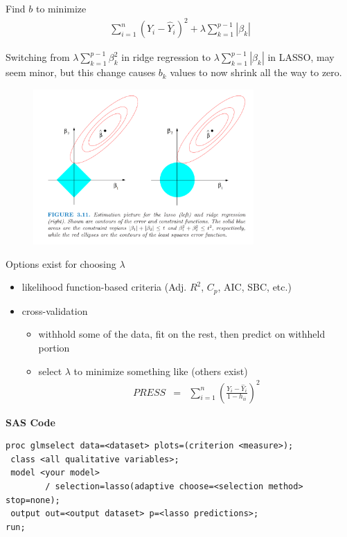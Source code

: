 \documentclass[12pt]{../notes}
\begin{document}
Find $b$ to minimize
  \begin{eqnarray}
    \sum_{i=1}^{n} \left( Y_i - \hat{Y}_i \right)^2 + \lambda \sum_{k=1}^{p-1} |\beta_k| \nonumber
  \end{eqnarray}
  
 Switching from $\lambda \sum_{k=1}^{p-1} \beta_k^2$ in ridge regression to $\lambda \sum_{k=1}^{p-1} |\beta_k|$ in LASSO, may seem minor, but this change causes $b_k$ values to now shrink all the way to zero. 


\begin{figure}[H]
\centering
\includegraphics[width = 0.75\textwidth]{../figures/module4/lasso.png}
\end{figure}

Options exist for choosing $\lambda$ 
\begin{itemize}
  \item likelihood function-based criteria (Adj. $R^2$, $C_p$, AIC, SBC, etc.)
  \item cross-validation
    \begin{itemize}
      \item withhold some of the data, fit on the rest, then predict on withheld portion
      \item select $\lambda$ to minimize something like (others exist)
        \begin{eqnarray}
          PRESS & = & \sum_{i=1}^{n} \left( \frac{Y_i - \hat{Y}_i }{1 - h_{ii}} \right)^2 \nonumber
        \end{eqnarray}
    \end{itemize}
\end{itemize}

\nspace
\textbf{SAS Code}
\begin{verbatim}
proc glmselect data=<dataset> plots=(criterion <measure>);
 class <all qualitative variables>;
 model <your model>
        / selection=lasso(adaptive choose=<selection method> stop=none);
 output out=<output dataset> p=<lasso predictions>;
run;
\end{verbatim}
\end{document}
